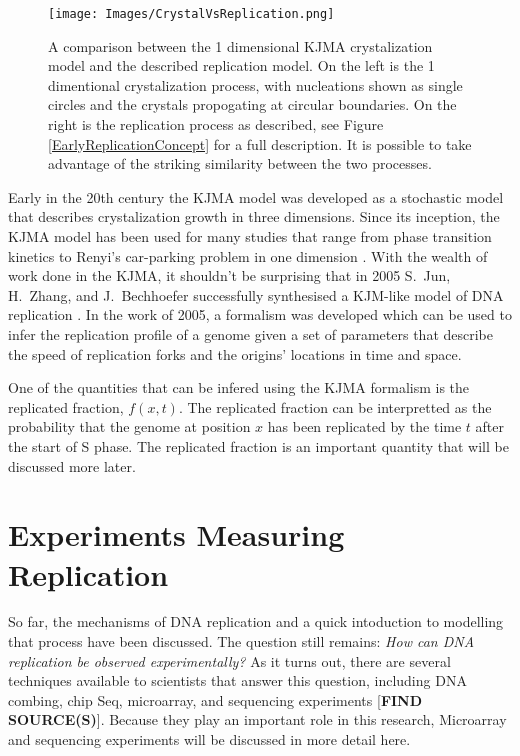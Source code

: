	\begin{figure}[tbh]
		\begin{center}
			\texttt{[image: Images/CrystalVsReplication.png]}
		\end{center}
			\caption[Comparing Crystalization with Replication]{\label{CrystalVsReplication} A comparison between the 1 dimensional KJMA crystalization model and the described replication model.
				On the left is the 1 dimentional crystalization process, with nucleations shown as single circles and the crystals propogating at circular boundaries.
				On the right is the replication process as described, see Figure \ref{EarlyReplicationConcept} for a full description.
				It is possible to take advantage of the striking similarity between the two processes.}
	\end{figure}
	
	Early in the 20th century the KJMA model was developed as a stochastic model that describes crystalization growth in three dimensions.
	Since its inception, the KJMA model has been used for many studies that range from phase transition kinetics \cite{AlloyPhaseTransitions} to Renyi's car-parking problem in one dimension \cite{CarParking}.
	With the wealth of work done in the KJMA, it shouldn't be surprising that in 2005 S.~Jun, H.~Zhang, and J.~Bechhoefer successfully synthesised a KJM-like model of DNA replication \cite{KJMA1,KJMA2}.
	In the work of 2005, a formalism was developed which can be used to infer the replication profile of a genome given a set of parameters that describe the speed of replication forks and the origins' locations in time and space.
	
	One of the quantities that can be infered using the KJMA formalism is the replicated fraction, $f(x,t)$.
	The replicated fraction can be interpretted as the probability that the genome at position $x$ has been replicated by the time $t$ after the start of S phase.
	The replicated fraction is an important quantity that will be discussed more later.
	
	
	\section{Experiments Measuring Replication}
	
	So far, the mechanisms of DNA replication and a quick intoduction to modelling that process have been discussed.
	The question still remains:
	\emph{How can DNA replication be observed experimentally?}
	As it turns out, there are several techniques available to scientists that answer this question, including DNA combing, chip Seq, microarray, and sequencing experiments [\textbf{FIND SOURCE(S)}].
	Because they play an important role in this research, Microarray and sequencing experiments will be discussed in more detail here.
	
